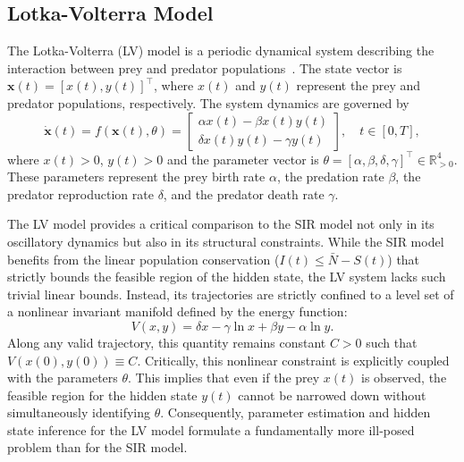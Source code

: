 \subsection{Lotka-Volterra Model}
\label{subsec:lotka-volterra}

The Lotka-Volterra (LV) model is a periodic dynamical system describing the interaction between prey and predator populations~\cite{lotka1925elements, volterra1927fluctuations}. 
The state vector is $\mathbf{x}(t) = [x(t), y(t)]^\top$, where $x(t)$ and $y(t)$ represent the prey and predator populations, respectively. 
The system dynamics are governed by
\begin{equation}
\label{eq:lv}
    \dot{\mathbf{x}}(t) = f(\mathbf{x}(t), \theta) = 
    \begin{bmatrix}
        \alpha x(t) - \beta x(t)y(t) \\[6pt]
        \delta x(t)y(t) - \gamma y(t)
    \end{bmatrix},
    \quad t \in [0, T],
\end{equation}
where $x(t)>0$, $y(t)>0$ and the parameter vector is $\theta = [\alpha, \beta, \delta, \gamma]^\top \in \mathbb{R}^4_{>0}$. 
These parameters represent the prey birth rate $\alpha$, the predation rate $\beta$, the predator reproduction rate $\delta$, and the predator death rate $\gamma$.

The LV model provides a critical comparison to the SIR model not only in its oscillatory dynamics but also in its structural constraints. 
While the SIR model benefits from the linear population conservation ($I(t) \le \bar{N} - S(t)$) that strictly bounds the feasible region of the hidden state, the LV system lacks such trivial linear bounds. 
Instead, its trajectories are strictly confined to a level set of a nonlinear invariant manifold defined by the energy function:
\begin{equation}
\label{eq:lv_conserve}
    V(x,y) = \delta x - \gamma \ln x + \beta y - \alpha \ln y.
\end{equation}
Along any valid trajectory, this quantity remains constant $C>0$ such that $V(x(0), y(0)) \equiv C$.
Critically, this nonlinear constraint is explicitly coupled with the parameters $\theta$.
This implies that even if the prey $x(t)$ is observed, the feasible region for the hidden state $y(t)$ cannot be narrowed down without simultaneously identifying $\theta$. 
Consequently, parameter estimation and hidden state inference for the LV model formulate a fundamentally more ill-posed problem than for the SIR model.

